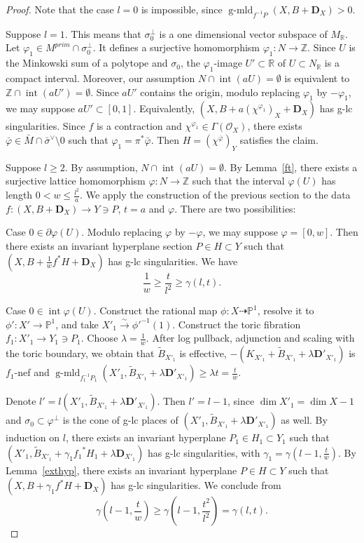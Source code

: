 \documentclass[12pt,twoside]{amsart}
\newcommand{\isoto}{{\overset{\sim}{\rightarrow}}}
\newcommand{\Z}{{\mathbb Z}}
\newcommand{\R}{{\mathbb R}}
\newcommand{\bP}{{\mathbb P}} %
\newcommand{\cO}{{\mathcal O}}
\newcommand{\bD}{{\mathbf D}}
\newcommand{\Int}{\operatorname{int}}
\newcommand{\gmld}{\operatorname{g-mld}}
\theoremstyle{plain}
\theoremstyle{definition}
\theoremstyle{remark}
\begin{document}
\begin{proof} Note that the case $l=0$ is impossible, since $\gmld_{f^{-1}P}(X,B+\bD_X)>0$.
	
	Suppose $l=1$. This means that $\sigma_0^\perp$ is a one dimensional
	vector subspace of $M_\R$. Let $\varphi_1\in M^{prim}\cap \sigma_0^\perp$.
	It defines a surjective homomorphism $\varphi_1\colon N\to \Z$.
	Since $U$ is the Minkowski sum of a polytope and $\sigma_0$, the $\varphi_1$-image
	 $U'\subset \R$ of $U\subset N_\R$ is a compact interval. Moreover, our
	 assumption $N\cap \Int(aU)=\emptyset$ is equivalent to $\Z\cap \Int(aU')=\emptyset$.
	 Since $aU'$ contains the origin, modulo replacing $\varphi_1$ by $-\varphi_1$, we may 
	 suppose $aU'\subset [0,1]$. Equivalently, $(X,B+a(\chi^{\varphi_1})_X+\bD_X)$ has 
	 g-lc singularities.
	 Since $f$ is a contraction and $\chi^{\varphi_1}\in \Gamma(\cO_X)$, 
	 there exists $\bar{\varphi}\in \bar{M}\cap \bar{\sigma}^\vee\setminus 0$ such that  
	$\varphi_1=\pi^*\bar{\varphi}$. Then $H=(\chi^{\bar{\varphi}})_Y$ satisfies the claim.
	
	Suppose $l \ge 2$. By assumption, $N\cap \Int(aU)=\emptyset$.
	By Lemma~\ref{ft}, there exists a surjective lattice homomorphism
	$\varphi\colon N\to \Z$ such that the interval $\varphi(U)$ has length $0<w\le \frac{l^2}{a}$.
	We apply the construction of the previous section to the data
	$f\colon (X,B+\bD_X)\to Y\ni P$, $t=a$ and $\varphi$. There are two possibilities:
	
	Case $0\in \partial \varphi(U)$. 
	Modulo replacing $\varphi$ by $-\varphi$, we may
	suppose $\varphi=[0,w]$. Then there exists an invariant hyperplane section 
	$P\in H\subset Y$ such that $(X,B+\frac{1}{w}f^*H+\bD_X)$ has g-lc singularities.
	We have 
	$$
	\frac{1}{w}\ge \frac{t}{l^2}\ge \gamma(l,t).
	$$
	
	Case $0\in \Int \varphi(U)$. Construct the rational map $\phi\colon X\dashrightarrow \bP^1$,
	resolve it to $\phi'\colon X'\to \bP^1$, and take $X'_1\isoto {\phi'}^{-1}(1)$. Construct
	the toric fibration $f_1\colon X'_1\to Y_1\ni P_1$. Choose $\lambda=\frac{1}{w}$.
	After log pullback, adjunction and scaling with the toric boundary, we obtain that 
	$\tilde{B}_{X'_1}$ is effective, 
	$-(K_{X'_1}+\tilde{B}_{X'_1}+\lambda\bD'_{X'_1})$ is $f_1$-nef and
	$\gmld_{f_1^{-1}P_1}(X'_1,\tilde{B}_{X'_1}+\lambda\bD'_{X'_1})\ge \lambda t=\frac{t}{w}$.
	
	Denote $l'=l(X'_1,\tilde{B}_{X'_1}+\lambda\bD'_{X'_1})$. Then $l'=l-1$, since 
	$\dim X'_1=\dim X-1$ and $\sigma_0\subset \varphi^\perp$ is the cone of g-lc places of 
	$(X'_1,\tilde{B}_{X'_1}+\lambda\bD'_{X'_1})$ as well. By induction on $l$, there exists 
	an invariant hyperplane $P_1\in H_1\subset Y_1$ such that 
	$(X'_1,\tilde{B}_{X'_1}+\gamma_1{f_1}^*H_1+\lambda  \bD_{X'_1})$ has g-lc
	singularities, with $\gamma_1=\gamma(l-1,\frac{t}{w})$.
	By Lemma~\ref{exthyp}, there exists 
	an invariant hyperplane $P\in H\subset Y$ such that 
	$(X,B+\gamma_1 f^*H+\bD_X)$ has g-lc singularities. We conclude from
	$$
	\gamma(l-1,\frac{t}{w})\ge \gamma(l-1,\frac{t^2}{l^2})=\gamma(l,t).
	$$
\end{proof}
\end{document}
